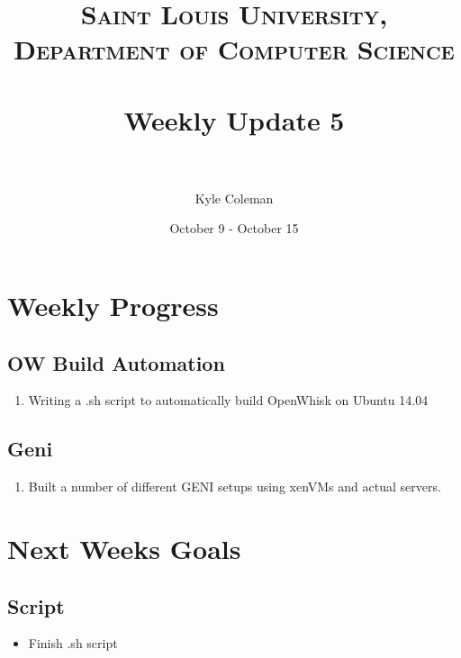 \documentclass[paper=a4, fontsize=12pt]{scrartcl} %
\title{	
\normalfont \normalsize 
\textsc{Saint Louis University, Department of Computer Science} \\ [25pt] %
\horrule{0.5pt} \\[0.4cm] %
\huge Weekly Update 5\\ %
\horrule{2pt} \\[0.5cm] %
}
\author{Kyle Coleman} %
\date{October 9 - October 15} %
\numberwithin{equation}{section} %
\numberwithin{figure}{section} %
\numberwithin{table}{section} %
\begin{document}
\maketitle %


\section{Weekly Progress}





\subsection{OW Build Automation}
\begin{enumerate}
	\item Writing a .sh script to automatically build OpenWhisk on Ubuntu 14.04
\end{enumerate}


\subsection{Geni}
\begin{enumerate}
	\item Built a number of different GENI setups using xenVMs and actual servers.
\end{enumerate}




\section{Next Weeks Goals}


\subsection{Script}
\begin{itemize}
	\item Finish .sh script
\end{itemize}
\end{document}
